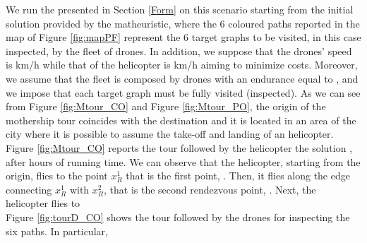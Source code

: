 \noindent
We run the  presented in Section \ref{Form} on this scenario starting from the initial solution provided by the matheuristic, where the 6 coloured paths reported in the map of Figure \ref{fig:mapPF} represent the 6 target graphs to be visited, in this case inspected, by the fleet of drones. In addition, we suppose that the drones' speed is  km/h while that of the helicopter is   km/h aiming to minimize costs.
Moreover, we assume that the fleet is composed by  drones with an endurance equal to , and we impose that each target graph must be fully visited (inspected).  As we can see from Figure \ref{fig:Mtour_CO} and Figure \ref{fig:Mtour_PO}, the origin of the mothership tour coincides with the destination and it is located in an area of the city where it is possible to assume the take-off and landing of an helicopter. Figure \ref{fig:Mtour_CO} reports the tour followed by the helicopter  the solution , after  hours of running time. We can observe that the helicopter, starting from the origin, flies to the point $x_R^1$ that is the first  point, . Then, it flies along the edge connecting $x_R^1$ with $x_R^2$, that is the second rendezvous point, . Next, the helicopter flies to \\
Figure \ref{fig:tourD_CO} shows the tour followed by the  drones for inspecting the six paths. In particular, 
